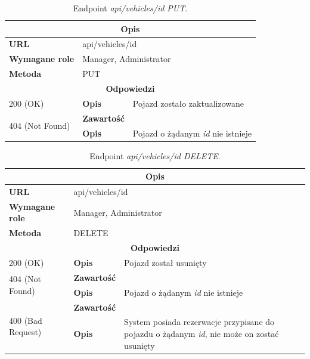\documentclass[eng,printmode,openany]{mgr}
\begin{document}
\begin{table}[H]
	\caption{Endpoint \textit{api/vehicles/id PUT}.}
	\begin{tabularx}{\textwidth}{|l|l|X|}
		\hline
		\multicolumn{3}{|c|}{\textbf{\textbf{Opis}}}
		\\ \hline
		\textbf{URL}                       & \multicolumn{2}{l|}{api/vehicles/id}
		\\ \hline
		\textbf{Wymagane role}             & \multicolumn{2}{l|}{Manager, Administrator}
		\\ \hline
		\textbf{Metoda}                    & \multicolumn{2}{l|}{PUT}
		\\ \hline
		\multicolumn{3}{|c|}{\textbf{Odpowiedzi}}
		\\ \hline
		200 (OK) 		                        & \textbf{Opis}      	& Pojazd zostało zaktualizowane
		\\ \hline
		\multirow{2}{*}{404 (Not Found)} 	    & \textbf{Zawartość}     &   
		\\ \cline{2-3}                          & \textbf{Opis}          & Pojazd o żądanym \textit{id} nie istnieje
		\\ \hline
	\end{tabularx}
\end{table}

\begin{table}[H]
	\caption{Endpoint \textit{api/vehicles/id DELETE}.}
	\begin{tabularx}{\textwidth}{|l|l|X|}
		\hline
		\multicolumn{3}{|c|}{\textbf{\textbf{Opis}}}
		\\ \hline
		\textbf{URL}                       & \multicolumn{2}{l|}{api/vehicles/id}
		\\ \hline
		\textbf{Wymagane role}             & \multicolumn{2}{l|}{Manager, Administrator}
		\\ \hline
		\textbf{Metoda}                    & \multicolumn{2}{l|}{DELETE}
		\\ \hline
		\multicolumn{3}{|c|}{\textbf{Odpowiedzi}}
		\\ \hline
		200 (OK)			                & \textbf{Opis}         	& Pojazd został usunięty
		\\ \hline
		\multirow{2}{*}{404 (Not Found)} 	& \textbf{Zawartość}     &    	
		\\ \cline{2-3}                      & \textbf{Opis}          & Pojazd o żądanym \textit{id} nie istnieje
		\\ \hline
		\multirow{2}{*}{400 (Bad Request)} 	& \textbf{Zawartość}     &    	
		\\ \cline{2-3}                      & \textbf{Opis}          & System posiada rezerwacje przypisane do pojazdu o żądanym \textit{id}, nie może on zostać usunięty
		\\ \hline
	\end{tabularx}
\end{table}
\end{document}
